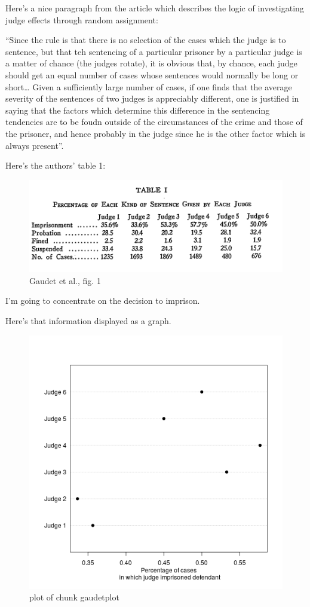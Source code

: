 \documentclass[12pt,twoside]{article}
\begin{document}
Here's a nice paragraph from the article which describes the logic of
investigating judge effects through random assignment:

``Since the rule is that there is no selection of the cases which the
judge is to sentence, but that teh sentencing of a particular prisoner
by a particular judge is a matter of chance (the judges rotate), it is
obvious that, by chance, each judge should get an equal number of cases
whose sentences would normally be long or short\ldots{} Given a
sufficiently large number of cases, if one finds that the average
severity of the sentences of two judges is appreciably different, one is
justified in saying that the factors which determine this difference in
the sentencing tendencies are to be foudn outside of the circumstances
of the crime and those of the prisoner, and hence probably in the judge
since he is the other factor which is always present''.

Here's the authors' table 1:

\begin{figure}[htbp]
\centering
\includegraphics{figure/gaudet_tab1.png}
\caption{Gaudet et al., fig. 1}
\end{figure}

I'm going to concentrate on the decision to imprison.

Here's that information displayed as a graph.

\begin{figure}[htbp]
\centering
\includegraphics{figure/gaudetplot-1.png}
\caption{plot of chunk gaudetplot}
\end{figure}
\end{document}

